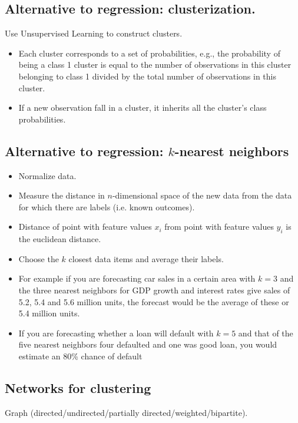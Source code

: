 \subsection{Alternative to regression: clusterization.}

Use Unsupervised Learning to construct clusters.
\begin{itemize}
    \item Each cluster corresponds to a set of probabilities, e.g., the probability of being a class 1 cluster is equal to the number of observations in this cluster belonging to class 1 divided by the total number of observations in this cluster.
    \item If a new observation fall in a cluster, it inherits all the cluster's class probabilities.
\end{itemize}

\subsection{Alternative to regression: $k$-nearest neighbors}

\begin{itemize}
    \item Normalize data.
    \item Measure the distance in $n$-dimensional space of the new data from the data for which there are labels (i.e. known outcomes).
    \item Distance of point with feature values $x_{i}$ from point with feature values $y_{i}$ is the euclidean distance.
    \item Choose the $k$ closest data items and average their labels.
    \item For example if you are forecasting car sales in a certain area with $k=3$ and the three nearest neighbors for GDP growth and interest rates give sales of 5.2, 5.4 and 5.6 million units, the forecast would be the average of these or 5.4 million units.
    \item If you are forecasting whether a loan will default with $k=5$ and that of the five nearest neighbors four defaulted and one was good loan, you would estimate an 80\% chance of default
\end{itemize}

\subsection{Networks for clustering}

Graph (directed/undirected/partially directed/weighted/bipartite).

